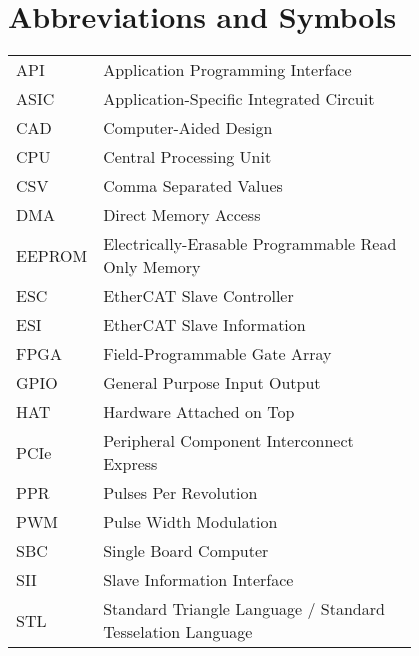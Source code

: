 \chapter*{Abbreviations and Symbols}

\begin{flushleft}
\begin{tabular}{l p{0.8\linewidth}}
API	& Application Programming Interface\\
ASIC	& Application-Specific Integrated Circuit\\
CAD	& Computer-Aided Design\\
CPU	& Central Processing Unit\\
CSV	& Comma Separated Values\\
DMA	& Direct Memory Access\\
EEPROM	& Electrically-Erasable Programmable Read Only Memory\\
ESC	& EtherCAT Slave Controller\\
ESI	& EtherCAT Slave Information\\
FPGA	& Field-Programmable Gate Array\\
GPIO	& General Purpose Input Output\\
HAT	& Hardware Attached on Top\\
PCIe	& Peripheral Component Interconnect Express\\
PPR	& Pulses Per Revolution\\
PWM	& Pulse Width Modulation\\
SBC	& Single Board Computer\\
SII	& Slave Information Interface\\
STL	& Standard Triangle Language / Standard Tesselation Language\\
\end{tabular}
\end{flushleft}

